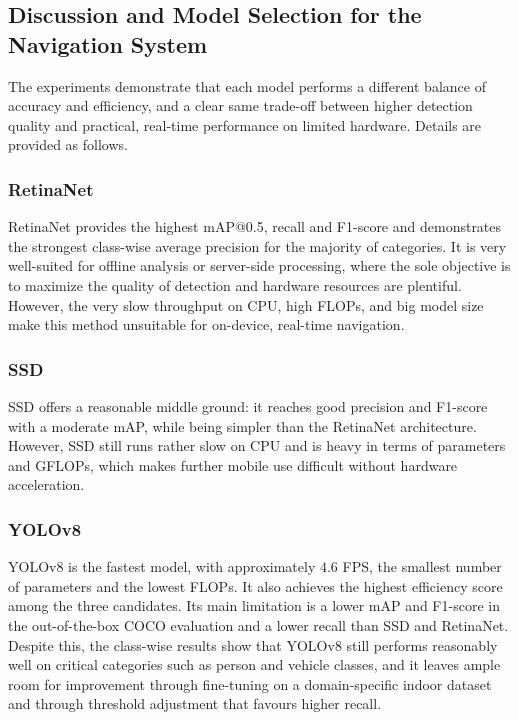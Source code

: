 \documentclass{FastFyp}
\begin{document}
\subsection{Discussion and Model Selection for the Navigation System}

The experiments demonstrate that each model performs a different balance of accuracy and efficiency, and a clear same trade-off between higher detection quality and practical, real-time performance on limited hardware. Details are provided as follows.

\subsubsection{RetinaNet}


RetinaNet provides the highest mAP@0.5, recall and F1-score and demonstrates the strongest class-wise average precision for the majority of categories. It is very well-suited for offline analysis or server-side processing, where the sole objective is to maximize the quality of detection and hardware resources are plentiful. However, the very slow throughput on CPU, high FLOPs, and big model size make this method unsuitable for on-device, real-time navigation.

\subsubsection{SSD}

SSD offers a reasonable middle ground: it reaches good precision and F1-score with a moderate mAP, while being simpler than the RetinaNet architecture. However, SSD still runs rather slow on CPU and is heavy in terms of parameters and GFLOPs, which makes further mobile use difficult without hardware acceleration.

\subsubsection{YOLOv8}

YOLOv8 is the fastest model, with approximately $4.6$ FPS, the smallest number of parameters and the lowest FLOPs. It also achieves the highest efficiency score among the three candidates. Its main limitation is a lower mAP and F1-score in the out-of-the-box COCO evaluation and a lower recall than SSD and RetinaNet. Despite this, the class-wise results show that YOLOv8 still performs reasonably well on critical categories such as person and vehicle classes, and it leaves ample room for improvement through fine-tuning on a domain-specific indoor dataset and through threshold adjustment that favours higher recall.
\end{document}
